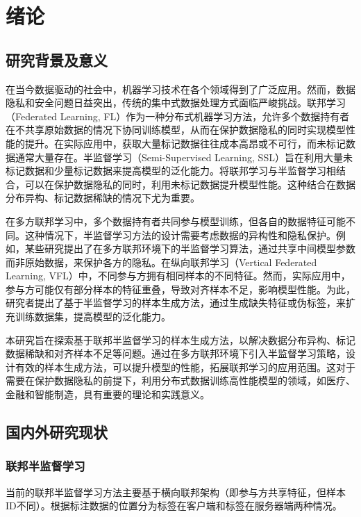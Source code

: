 

\chapter{绪论} %
\thispagestyle{others} %
\pagestyle{others} %
\xiaosi %


\section{研究背景及意义}
在当今数据驱动的社会中，机器学习技术在各个领域得到了广泛应用。然而，数据隐私和安全问题日益突出，传统的集中式数据处理方式面临严峻挑战\citep{chen2021secureboost+,de2010practical}。联邦学习（Federated Learning, FL）作为一种分布式机器学习方法，允许多个数据持有者在不共享原始数据的情况下协同训练模型，从而在保护数据隐私的同时实现模型性能的提升。在实际应用中，获取大量标记数据往往成本高昂或不可行，而未标记数据通常大量存在。半监督学习（Semi-Supervised Learning, SSL）旨在利用大量未标记数据和少量标记数据来提高模型的泛化能力。将联邦学习与半监督学习相结合，可以在保护数据隐私的同时，利用未标记数据提升模型性能\citep{li2021comatch}。这种结合在数据分布异构、标记数据稀缺的情况下尤为重要。

在多方联邦学习中，多个数据持有者共同参与模型训练，但各自的数据特征可能不同。这种情况下，半监督学习方法的设计需要考虑数据的异构性和隐私保护。例如，某些研究提出了在多方联邦环境下的半监督学习算法，通过共享中间模型参数而非原始数据，来保护各方的隐私。在纵向联邦学习（Vertical Federated Learning, VFL）中，不同参与方拥有相同样本的不同特征。然而，实际应用中，参与方可能仅有部分样本的特征重叠，导致对齐样本不足，影响模型性能。为此，研究者提出了基于半监督学习的样本生成方法，通过生成缺失特征或伪标签，来扩充训练数据集，提高模型的泛化能力。

本研究旨在探索基于联邦半监督学习的样本生成方法，以解决数据分布异构、标记数据稀缺和对齐样本不足等问题。通过在多方联邦环境下引入半监督学习策略，设计有效的样本生成方法，可以提升模型的性能，拓展联邦学习的应用范围。这对于需要在保护数据隐私的前提下，利用分布式数据训练高性能模型的领域，如医疗、金融和智能制造，具有重要的理论和实践意义。
\section{国内外研究现状}
\subsection{联邦半监督学习}
当前的联邦半监督学习方法主要基于横向联邦架构（即参与方共享特征，但样本ID不同）。根据标注数据的位置分为标签在客户端和标签在服务器端两种情况\citep{jin2023federated}。

